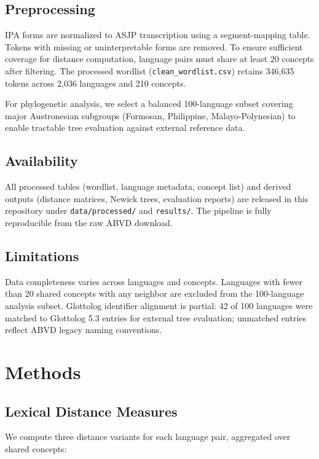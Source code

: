\documentclass[manuscript]{clv2025}
\begin{document}
\subsection{Preprocessing}
IPA forms are normalized to ASJP transcription \cite{wichmann2010asjp} using a segment-mapping table. Tokens with missing or uninterpretable forms are removed. To ensure sufficient coverage for distance computation, language pairs must share at least 20 concepts after filtering. The processed wordlist (\texttt{clean\_wordlist.csv}) retains 346{,}635 tokens across 2{,}036 languages and 210 concepts.

For phylogenetic analysis, we select a balanced 100-language subset covering major Austronesian subgroups (Formosan, Philippine, Malayo-Polynesian) to enable tractable tree evaluation against external reference data.

\subsection{Availability}
All processed tables (wordlist, language metadata, concept list) and derived outputs (distance matrices, Newick trees, evaluation reports) are released in this repository under \texttt{data/processed/} and \texttt{results/}. The pipeline is fully reproducible from the raw ABVD download.

\subsection{Limitations}
Data completeness varies across languages and concepts. Languages with fewer than 20 shared concepts with any neighbor are excluded from the 100-language analysis subset. Glottolog identifier alignment is partial: 42 of 100 languages were matched to Glottolog 5.3 entries for external tree evaluation; unmatched entries reflect ABVD legacy naming conventions.

\section{Methods}
\label{sec:methods}

\subsection{Lexical Distance Measures}

We compute three distance variants for each language pair, aggregated over shared concepts:
\end{document}

